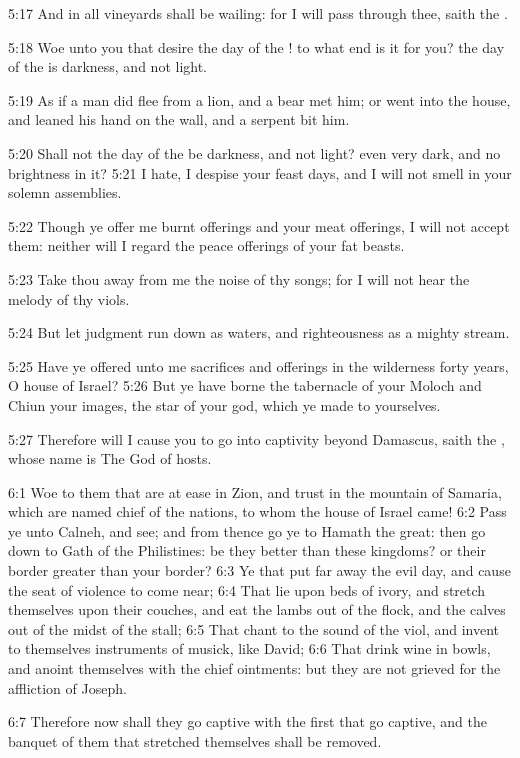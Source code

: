 5:17 And in all vineyards shall be wailing: for I will pass through thee, saith the \LORD.

5:18 Woe unto you that desire the day of the \LORD! to what end is it for you? the day of the \LORD is darkness, and not light.

5:19 As if a man did flee from a lion, and a bear met him; or went into the house, and leaned his hand on the wall, and a serpent bit him.

5:20 Shall not the day of the \LORD be darkness, and not light? even very dark, and no brightness in it?  5:21 I hate, I despise your feast days, and I will not smell in your solemn assemblies.

5:22 Though ye offer me burnt offerings and your meat offerings, I will not accept them: neither will I regard the peace offerings of your fat beasts.

5:23 Take thou away from me the noise of thy songs; for I will not hear the melody of thy viols.

5:24 But let judgment run down as waters, and righteousness as a mighty stream.

5:25 Have ye offered unto me sacrifices and offerings in the wilderness forty years, O house of Israel?  5:26 But ye have borne the tabernacle of your Moloch and Chiun your images, the star of your god, which ye made to yourselves.

5:27 Therefore will I cause you to go into captivity beyond Damascus, saith the \LORD, whose name is The God of hosts.

6:1 Woe to them that are at ease in Zion, and trust in the mountain of Samaria, which are named chief of the nations, to whom the house of Israel came!  6:2 Pass ye unto Calneh, and see; and from thence go ye to Hamath the great: then go down to Gath of the Philistines: be they better than these kingdoms? or their border greater than your border?  6:3 Ye that put far away the evil day, and cause the seat of violence to come near; 6:4 That lie upon beds of ivory, and stretch themselves upon their couches, and eat the lambs out of the flock, and the calves out of the midst of the stall; 6:5 That chant to the sound of the viol, and invent to themselves instruments of musick, like David; 6:6 That drink wine in bowls, and anoint themselves with the chief ointments: but they are not grieved for the affliction of Joseph.

6:7 Therefore now shall they go captive with the first that go captive, and the banquet of them that stretched themselves shall be removed.


